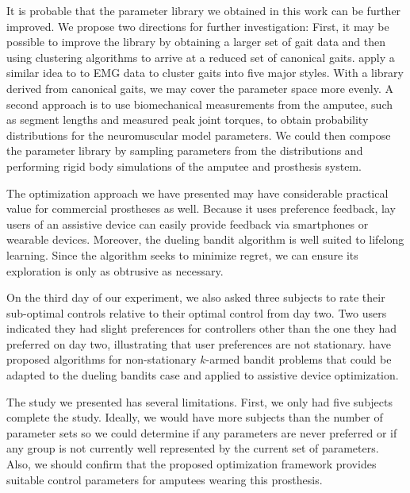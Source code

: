It is probable that the parameter library we obtained in this work can be
further improved. We propose two directions for further investigation: First, it
may be possible to improve the library by obtaining a larger set of gait data
and then using clustering algorithms to arrive at a reduced set of canonical
gaits. \citet{vardaxis1998classification} apply a similar idea to to EMG data to
cluster gaits into five major styles. With a library derived from canonical
gaits, we may cover the parameter space more evenly. A second approach is to use
biomechanical measurements from the amputee, such as segment lengths and
measured peak joint torques, to obtain probability distributions for the
neuromuscular model parameters. We could then compose the parameter library by
sampling parameters from the distributions and performing rigid body simulations
of the amputee and prosthesis system.

The optimization approach we have presented may have considerable practical
value for commercial prostheses as well. Because it uses preference feedback,
lay users of an assistive device can easily provide feedback via smartphones or
wearable devices. Moreover, the dueling bandit algorithm is well suited to
lifelong learning. Since the algorithm seeks to minimize regret, we can ensure
its exploration is only as obtrusive as necessary. 

On the third day of our experiment, we also asked three subjects to rate their
sub-optimal controls relative to their optimal control from day two. Two users
indicated they had slight preferences for controllers other than the one they
had preferred on day two, illustrating that user preferences are not stationary.
\citet{garivier2008upper} have proposed algorithms for non-stationary $k$-armed
bandit problems that could be adapted to the dueling bandits case and applied to
assistive device optimization.

The study we presented has several limitations. First, we only had five subjects
complete the study. Ideally, we would have more subjects than the number of
parameter sets so we could determine if any parameters are never preferred or if
any group is not currently well represented by the current set of parameters.
Also, we should confirm that the proposed optimization framework provides
suitable control parameters for amputees wearing this prosthesis.
